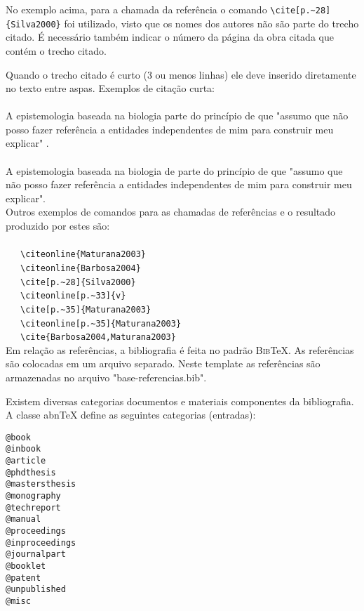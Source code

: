 No exemplo acima, para a chamada da referência o comando \verb|\cite[p.~28]{Silva2000}| foi utilizado, visto que os nomes dos autores não são parte do trecho citado. É necessário também indicar o número da página da obra citada que contém o trecho citado.

Quando o trecho citado é curto (3 ou menos linhas) ele deve inserido diretamente no texto entre aspas. Exemplos de citação curta:\\
\\A epistemologia baseada na biologia parte do princípio de que "assumo que não posso fazer referência a entidades independentes de mim para construir meu explicar" \cite[p.~35]{Maturana2003}.\\
\\A epistemologia baseada na biologia de  parte do princípio de que "assumo que não posso fazer referência a entidades independentes de mim para construir meu explicar".\\

Outros exemplos de comandos para as chamadas de referências e o resultado produzido por estes são:\\
\\ \ \ \  \verb|\citeonline{Maturana2003}|\\
 \ \ \   \verb|\citeonline{Barbosa2004}|\\
\cite[p.~28]{Silva2000} \ \ \  \verb|\cite[p.~28]{Silva2000}|\\
 \ \ \   \verb|\citeonline[p.~33]{v}|\\
\cite[p.~35]{Maturana2003} \ \ \   \verb|\cite[p.~35]{Maturana2003}|\\
 \ \ \   \verb|\citeonline[p.~35]{Maturana2003}|\\
\cite{Barbosa2004,Maturana2003} \ \ \   \verb|\cite{Barbosa2004,Maturana2003}|\\

Em relação as referências, a bibliografia é feita no padrão \textsc{Bib}\TeX{}. As referências são colocadas em um arquivo separado. Neste template as referências são armazenadas no arquivo "base-referencias.bib".

Existem diversas categorias documentos e materiais componentes da bibliografia. A classe abn\TeX{} define as seguintes categorias (entradas):

\begin{verbatim}
@book
@inbook
@article
@phdthesis
@mastersthesis
@monography
@techreport
@manual
@proceedings
@inproceedings
@journalpart
@booklet
@patent
@unpublished
@misc
\end{verbatim}

